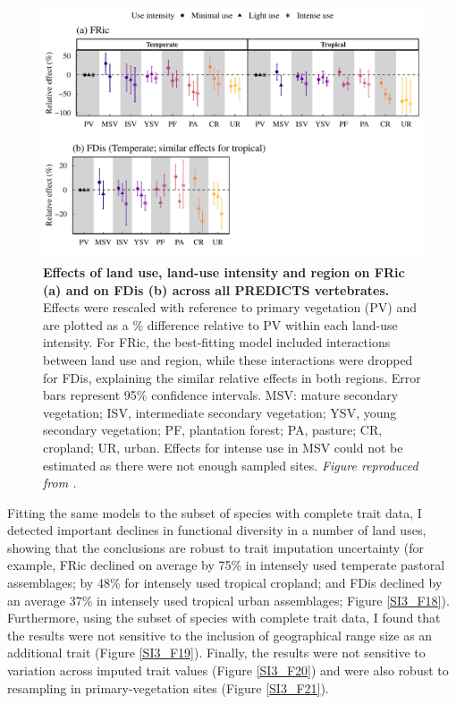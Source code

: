 \begin{figure}[h!]
\centering
\includegraphics[scale=0.75]{figures/Chapter_FD/Figure2}
\caption[Effects of land use, land-use intensity and region on FRic (a) and on FDis (b) across all PREDICTS vertebrates.]{\textbf{ Effects of land use, land-use intensity and region on FRic (a) and on FDis (b) across all PREDICTS vertebrates.} Effects were rescaled with reference to primary vegetation (PV) and are plotted as a \% difference relative to PV within each land-use intensity. For FRic, the best-fitting model included interactions between land use and region, while these interactions were dropped for FDis, explaining the similar relative effects in both regions. Error bars represent 95\% confidence intervals. MSV: mature secondary vegetation; ISV, intermediate secondary vegetation; YSV, young secondary vegetation; PF, plantation forest; PA, pasture; CR, cropland; UR, urban. Effects for intense use in MSV could not be estimated as there were not enough sampled sites. \textit{Figure reproduced from \citet{Etard2021}.}}
\label{chap3_fig2}
\end{figure}

Fitting the same models to the subset of species with complete trait data, I detected important declines in functional diversity in a number of land uses, showing that the conclusions are robust to trait imputation uncertainty (for example, FRic declined on average by 75\% in intensely used temperate pastoral assemblages; by 48\% for intensely used tropical cropland; and FDis declined by an average 37\% in intensely used tropical urban assemblages; Figure \ref{SI3_F18}). Furthermore, using the subset of species with complete trait data, I found that the results were not sensitive to the inclusion of geographical range size as an additional trait (Figure \ref{SI3_F19}). Finally, the results were not sensitive to variation across imputed trait values (Figure \ref{SI3_F20}) and were also robust to resampling in primary-vegetation sites (Figure \ref{SI3_F21}).

